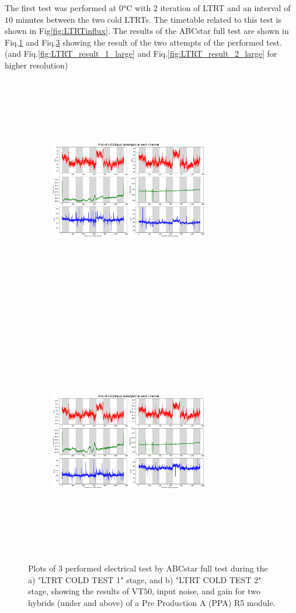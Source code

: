 The first test was performed at $0 \si{\celsius}$ with $2$ iteration of LTRT and an interval of $10$ minutes between the two cold LTRTs. The timetable related to this test is shown in Fig\ref{fig:LTRTinflux}. The results of the ABCstar full test are shown in Fiq.\ref{fig:LTRT_result_1} and Fiq.\ref{fig:LTRT_result_2} showing the result of the two attempts of the performed test. (and Fiq.\ref{fig:LTRT_result_1_large} and Fiq.\ref{fig:LTRT_result_2_large} for higher resolution)

\begin{figure}[h]
    \begin{subfigure}[b]{0.45\textwidth}
        \centering
        \includegraphics[width=7cm,height=10cm,keepaspectratio]{Figures/results/LTRT_1_plot.png}
        \caption{}
        \label{fig:LTRT_result_1}
    \end{subfigure}
    ~
    \begin{subfigure}[b]{0.45\textwidth}
        \centering
        \includegraphics[width=7cm,height=10cm,keepaspectratio]{Figures/results/LTRT_2_plot.png}
        \caption{}
        \label{fig:LTRT_result_2}
    \end{subfigure}
    \caption{Plots of $3$ performed electrical test by ABCstar full test during the a) "LTRT COLD TEST 1" stage, and b) "LTRT COLD TEST 2" stage, showing the results of VT$50$, input noise, and gain for two hybrids (under and above) of a Pre Production A (PPA) R5 module.}
    

\end{figure}
